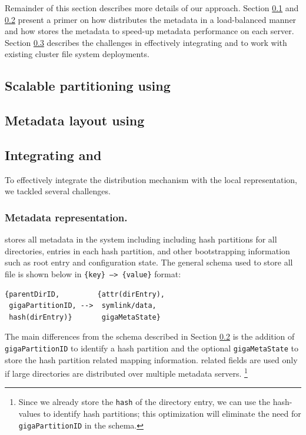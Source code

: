Remainder of this section describes more details of our approach. 
Section \ref{design.giga} and \ref{design.tablefs} present a primer on how
\giga{} distributes the metadata in a load-balanced manner and how \tfs{}
stores the metadata to speed-up metadata performance on each server. 
Section \ref{design.integration} describes the challenges in effectively
integrating \giga{} and \tfs{} to work with existing cluster file system
deployments. 

\subsection{Scalable partitioning using \giga{}}
\label{design.giga}


\subsection{Metadata layout using \tfs{}}
\label{design.tablefs}


\subsection{Integrating \giga{} and \tfs{}}
\label{design.integration}

To effectively integrate the \giga{} distribution mechanism with the
\tfs{} local representation, we tackled several challenges. 

\subsubsection*{Metadata representation.}

\tfs{} stores all metadata in the system including including \giga{} hash
partitions for all directories, entries in each hash partition, and other
bootstrapping information such as root entry and \giga{} configuration state.
The general schema used to store all file is shown below in
\texttt{\{key\} --> \{value\}} format:

\begin{verbatim}
{parentDirID,         {attr(dirEntry),
 gigaPartitionID, -->  symlink/data,
 hash(dirEntry)}       gigaMetaState}
\end{verbatim}

The main differences from the \tfs{} schema described in Section
\ref{design.tablefs} is the addition of \texttt{gigaPartitionID} to identify a
\giga{} hash partition and the optional \texttt{gigaMetaState} to store the
hash partition related mapping information. \giga{} related fields are used
only if large directories are distributed over multiple metadata servers.
\footnote{
Since we already store the \texttt{hash} of the directory entry, we can use the
hash-values to identify hash partitions; this optimization will eliminate the
need for \texttt{gigaPartitionID} in the schema.} 

